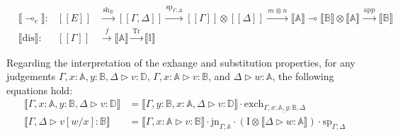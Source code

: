 \begin{align*}
      &\llbracket \multimap_e \rrbracket : & [\![E]\!] & \xrightarrow{\hspace{2pt}\text{sh}_{E}\hspace{2pt}}   [\![\Gamma,\Delta ]\!]   \xrightarrow{\hspace{1pt}\text{sp}_{\Gamma;\Delta}\hspace{1pt}}  [\![\Gamma ]\!] \otimes [\![\Delta ]\!]  \xrightarrow{\hspace{2pt} m \hspace{1pt} \otimes \hspace{1pt} n \hspace{2pt}} \llbracket \mathbb{A} \rrbracket \multimap \llbracket \mathbb{B} \rrbracket \otimes \llbracket \mathbb{A} \rrbracket  \xrightarrow{\hspace{2pt} \text{app} \hspace{2pt}} \llbracket \mathbb{B} \rrbracket \\
      &\llbracket \text{dis} \rrbracket : & [\![\Gamma]\!] & \xrightarrow{\hspace{2pt} f \hspace{2pt}} \llbracket \mathbb{A} \rrbracket \xrightarrow{\hspace{2pt} \text{Tr} \hspace{2pt}} \llbracket \mathbb{I} \rrbracket
\end{align*} 


Regarding the interpretation of the exhange and substitution properties, for any judgements $\Gamma, x: \mathbb{A}, y: \mathbb{B}, \Delta \triangleright v : \mathbb{D}$, $\Gamma, x: \mathbb{A} \triangleright v: \mathbb{B}$, and $\Delta \triangleright w: \mathbb{A}$, the following equations hold:
\begin{equation}
\begin{split}
  \llbracket \Gamma, x: \mathbb{A}, y: \mathbb{B}, \Delta \triangleright v : \mathbb{D} \rrbracket & = \llbracket \Gamma,  y: \mathbb{B}, x: \mathbb{A}, \Delta \triangleright v : \mathbb{D} \rrbracket \cdot \text{exch}_{\Gamma, \underline{x: \mathbb{A}, y: \mathbb{B}}, \Delta}\\
  \llbracket \Gamma,\Delta \triangleright v[w/x]: \mathbb{B} \rrbracket & = \llbracket \Gamma, x: \mathbb{A} \triangleright v: \mathbb{B} \rrbracket \cdot \text{jn}_{\Gamma;\mathbb{A}} \cdot (\text{I} \otimes \llbracket \Delta \triangleright w: \mathbb{A} \rrbracket ) \cdot \text{sp}_{\Gamma; \Delta} 
\end{split}
\end{equation}

